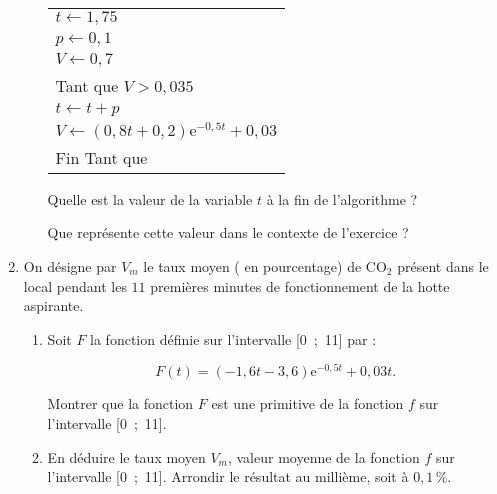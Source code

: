 \documentclass{cornouaille}
\begin{document}
\begin{exercice}
\begin{enumerate}
\begin{enumerate}
\begin{center}
\begin{tabularx}{0.5\linewidth}{|X|}\hline
$t \gets 1,75$\\
$p \gets 0,1$\\
$V \gets 0,7$\\
Tant que $V > 0,035$\\
\hspace{0.75cm}$t \gets t + p$\\
\hspace{0.75cm}$V \gets (0,8t + 0,2)\text{e}^{-0,5t} + 0,03$\\
Fin Tant que\\ \hline
\end{tabularx}
\end{center}		
		
Quelle est la valeur de la variable $t$ à la fin de l'algorithme ?
		
Que représente cette valeur dans le contexte de l'exercice ?
 	\end{enumerate}
\item  On désigne par $V_m$ le taux moyen ( en pourcentage) de CO$_2$ présent dans le local pendant les $11$
premières minutes de fonctionnement de la hotte aspirante.
	\begin{enumerate}
		\item Soit $F$ la fonction définie sur l'intervalle [0~;~11] par : 
		
		\[F(t) = (-1,6t -3,6)\text{e}^{-0,5t} + 0,03t.\]
		
Montrer que la fonction $F$ est une primitive de la fonction $f$ sur l'intervalle [0~;~11].
		\item En déduire le taux moyen $V_m$, valeur moyenne de la fonction $f$ sur l'intervalle [0~;~11].
Arrondir le résultat au millième, soit à $0,1$\,\%.
	\end{enumerate}
\end{enumerate}
\end{exercice}
\end{document}
